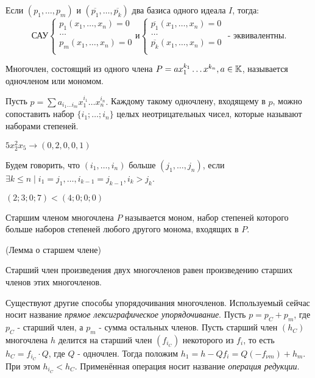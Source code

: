 \utv Если $(p_1,\ldots,p_m)$ и $(\overline{p_1},\ldots,\overline{p_k})$ два базиса одного идеала $I$, тогда:
\begin{equation*}
	\text{САУ}
	\begin{cases}
	   	p_1(x_1,\ldots,x_n) = 0\\
		\ldots\\
	   	p_m(x_1,\ldots,x_n) = 0\\
	\end{cases}
\text{и}
	\begin{cases}
	   	\overline{p_1}(x_1,\ldots,x_n) = 0\\
		\ldots\\
	   	\overline{p_k}(x_1,\ldots,x_n) = 0\\
	\end{cases}
\text{ - эквивалентны.}
\end{equation*}

\opr Многочлен, состоящий из одного члена $P = ax_1^{k_1}\ldots x^{k_n}, a \in \mathbb{K}$, называется одночленом или мономом.

Пусть $p = \sum a_{i_1 \ldots i_m}x_1^{i_1}\ldots x_n^{i_n}.$ Каждому такому одночлену, входящему в $p$, можно сопоставить набор $\{i_1;\ldots;i_n\}$  целых неотрицательных чисел, которые называют наборами степеней.

\example $5x_2^2x_5 \rightarrow (0,2,0,0,1)$

\opr Будем говорить, что $(i_1,\ldots,i_n)$ больше $(j_1,\ldots,j_n)$, если $\exists k \le n \mid i_1 = j_1, \ldots, i_{k-1} = j_{k-1},i_k > j_k$.

\example $(2;3;0;7) < (4;0;0;0)$

\opr Старшим членом многочлена $P$ называется моном, набор степеней которого больше наборов степеней любого другого монома, входящих в $P$.

\lem (Лемма о старшем члене)

Старший член произведения двух многочленов равен произведению старших членов этих многочленов.

\note Существуют другие способы упорядочивания многочленов. Используемый сейчас носит название \textit{прямое лексиграфическое упорядочивание}. Пусть $p = p_C + p_m$, где $p_C$ - старший член, а $p_m$ - сумма остальных членов. Пусть старший член $(h_C)$ многочлена $h$ делится на старший член $(f_{i_C})$ некоторого из $f_i$, то есть $h_C = f_{i_C} \cdot Q$, где $Q$ - одночлен. Тогда положим $h_1 = h - Qf_i = Q(-f_{\nu m}) + h_m$. При этом $h_{i_C} < h_C$. Применённая операция носит название \emph{операция редукции}.

